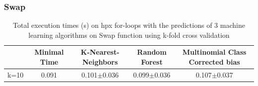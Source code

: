 \subsubsection{Swap}

\begin{table}[H]
	\centering
	\caption{Total execution times (s) on hpx for-loops with the predictions of 3 machine learning algorithms on Swap function using k-fold cross validation}
	\label{my-label}
	\begin{tabular}{|c|c|c|c|c|}
		\hline
		& Minimal Time&K-Nearest-Neighbors & Random Forest &Multinomial Class Corrected bias\\ \hline
		k=10  &0.091&
		0.101$\pm$0.036       & 0.099$\pm$0.036&0.107$\pm$0.037 \\ \hline
	\end{tabular}
\end{table}

